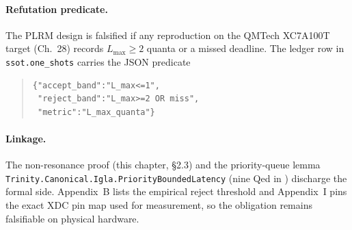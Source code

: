 \paragraph{Refutation predicate.}
The PLRM design is falsified if any reproduction on the QMTech XC7A100T
target (Ch.~28) records $L_{\max} \ge 2$ quanta or a missed deadline.
The ledger row in \texttt{ssot.one\_shots} carries the JSON predicate
\begin{quote}\footnotesize
\begin{verbatim}
{"accept_band":"L_max<=1",
 "reject_band":"L_max>=2 OR miss",
 "metric":"L_max_quanta"}
\end{verbatim}
\end{quote}

\paragraph{Linkage.}
The non-resonance proof (this chapter, §2.3) and the priority-queue lemma
\texttt{Trinity.Canonical.Igla.PriorityBoundedLatency} (nine Qed in
) discharge the formal side.
Appendix~B lists the empirical reject threshold and Appendix~I pins the
exact XDC pin map used for measurement, so the obligation remains
falsifiable on physical hardware.
